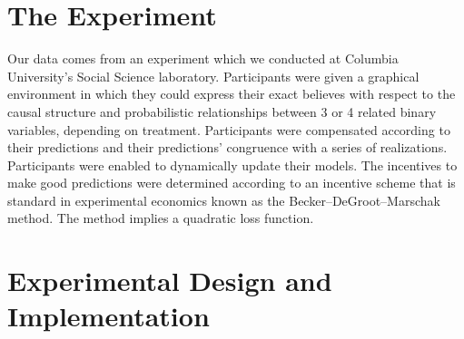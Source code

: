 \section{The Experiment} 

Our data comes from an experiment which we conducted at Columbia University's Social Science laboratory.  Participants were given a graphical environment in which they could express their exact believes with respect to the causal structure and probabilistic relationships between 3 or 4 related binary variables, depending on treatment.  Participants were compensated according to their predictions and their predictions' congruence with a series of realizations.  Participants were enabled to dynamically update their models.   The incentives to make good predictions were determined according to an incentive scheme that is standard in experimental economics known as the Becker–DeGroot–Marschak method.  The method implies a quadratic loss function. 

\section{Experimental Design and Implementation}







